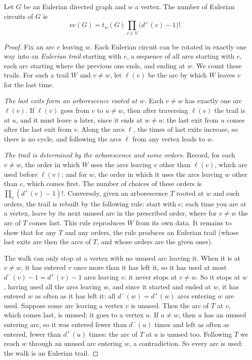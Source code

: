 \begin{theorem}\label{spectral:thm:best}
Let $G$ be an Eulerian directed graph and $w$ a vertex. The number of Eulerian circuits of $G$ is
\[
\mathrm{ec}(G)=t_w(G)\prod_{v\in V}\bigl(d^+(v)-1\bigr)!.
\]
\end{theorem}
\begin{proof}
Fix an arc $e$ leaving $w$. Each Eulerian circuit can be rotated in exactly one way into an \emph{Eulerian trail} starting with $e$, a sequence of all arcs starting with $e$, each arc
starting where the previous one ends, and ending at $w$. We count these trails. For such a trail $W$ and $v\ne w$, let $\ell(v)$ be the arc by which $W$ leaves $v$ for the last time.

\emph{The last exits form an arborescence rooted at $w$.} Each $v\ne w$ has exactly one arc $\ell(v)$. If $\ell(v)$ goes from $v$ to $u\ne w$, then after traversing $\ell(v)$ the trail is at $u$, and it
must leave $u$ later, since it ends at $w\ne u$: the last exit from $u$ comes after the last exit from $v$. Along the arcs $\ell$, the times of last exits increase, so there is no cycle, and
following the arcs $\ell$ from any vertex leads to $w$.

\emph{The trail is determined by the arborescence and some orders.} Record, for each $v\ne w$, the order in which $W$ uses the arcs leaving $v$ other than $\ell(v)$, which are used before
$\ell(v)$; and for $w$, the order in which it uses the arcs leaving $w$ other than $e$, which comes first. The number of choices of these orders is $\prod_v(d^+(v)-1)!$. Conversely, given an
arborescence $T$ rooted at $w$ and such orders, the trail is rebuilt by the following rule: start with $e$; each time you are at a vertex, leave by its next unused arc in the prescribed
order, where for $v\ne w$ the arc of $T$ comes last. This rule reproduces $W$ from its own data. It remains to show that for any $T$ and any orders, the rule produces an Eulerian trail
(whose last exits are then the arcs of $T$, and whose orders are the given ones).

The walk can only stop at a vertex with no unused arc leaving it. When it is at $v\ne w$, it has entered $v$ once more than it has left it, so it has used at most $d^-(v)-1=d^+(v)-1$ arcs leaving $v$:
it never stops at $v\ne w$. So it stops at $w$, having used all the arcs leaving $w$, and since it started and ended at $w$, it has entered $w$ as often as it has left it: all $d^-(w)=d^+(w)$ arcs
entering $w$ are used. Suppose some arc leaving a vertex $v$ is unused. Then the arc of $T$ at $v$, which comes last, is unused; it goes to a vertex $u$. If $u\ne w$, then $u$ has an unused entering arc,
so it was entered fewer than $d^-(u)$ times and left as often as entered, fewer than $d^+(u)$ times: the arc of $T$ at $u$ is unused too. Following $T$ we reach $w$ through an unused arc entering $w$,
a contradiction. So every arc is used: the walk is an Eulerian trail.
\end{proof}

